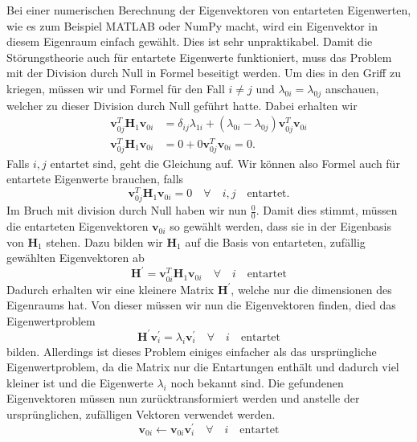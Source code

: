 Bei einer numerischen Berechnung der Eigenvektoren von entarteten Eigenwerten, wie es zum Beispiel MATLAB oder NumPy macht, wird ein Eigenvektor in diesem Eigenraum einfach gewählt.
Dies ist sehr unpraktikabel.
Damit die Störungstheorie auch für entartete Eigenwerte funktioniert, muss das Problem mit der Division durch Null in Formel  beseitigt werden.
Um dies in den Griff zu kriegen, müssen wir und Formel  für den Fall $i \neq j$ und $\lambda_{0i} = \lambda_{0j}$ anschauen, welcher zu dieser Division durch Null geführt hatte.
Dabei erhalten wir
\begin{align}
    \bm v_{0j}^T \bm H_1 \bm v_{0i}
    &=
    \delta_{ij} \lambda_{1i} +
    ( \lambda_{0i} - \lambda_{0j} )
    \bm v_{0j}^T  \bm v_{0i}
    \\
    \bm v_{0j}^T \bm H_1 \bm v_{0i}
    &=
    0 +
    0
    \bm v_{0j}^T  \bm v_{0i}
    = 0.
\end{align}
Falls $i, j$ entartet sind, geht die Gleichung auf.
Wir können also Formel  auch für entartete Eigenwerte brauchen, falls
\begin{equation}
    \bm v_{0j}^T \bm H_1 \bm v_{0i} = 0 \quad \forall \quad i,j \quad \text{entartet}.
\end{equation} \label{ew:eq:condition-degenerated}
Im Bruch mit division durch Null haben wir nun $\frac{0}{0}$.
Damit dies stimmt, müssen die entarteten Eigenvektoren $\bm v_{0i}$ so gewählt werden, dass sie in der Eigenbasis von $\bm H_1$ stehen. %
Dazu bilden wir $\bm H_1$ auf die Basis von entarteten, zufällig gewählten Eigenvektoren ab
\begin{equation*}
    \bm H^\prime = \bm v_{0i}^T \bm H_1 \bm v_{0i} \quad \forall \quad i \quad \text{entartet}
\end{equation*}
Dadurch erhalten wir eine kleinere Matrix $\bm H^\prime$, welche nur die dimensionen des Eigenraums hat.
Von dieser müssen wir nun die Eigenvektoren finden, died das Eigenwertproblem
\begin{equation*}
    \bm H^\prime \bm v_{i}^\prime = \lambda_{i} \bm v_i^\prime \quad \forall \quad i \quad \text{entartet}
\end{equation*}
bilden.
Allerdings ist dieses Problem einiges einfacher als das ursprüngliche Eigenwertproblem, da die Matrix nur die Entartungen enthält und dadurch viel kleiner ist und die Eigenwerte $\lambda_i$ noch bekannt sind.
Die gefundenen Eigenvektoren müssen nun zurücktransformiert werden und anstelle der ursprünglichen, zufälligen Vektoren verwendet werden.
\begin{equation*}
    \bm v_{0i} \gets \bm v_{0i} \bm v_{i}^\prime \quad \forall \quad i \quad \text{entartet}
\end{equation*}

